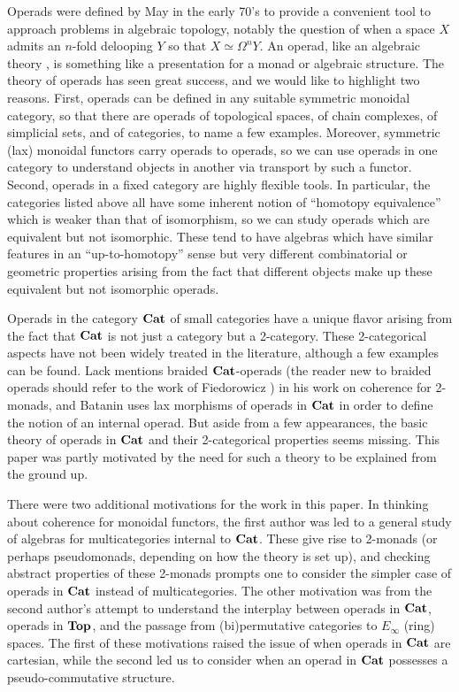 Operads were defined by May \cite{maygeom} in the early 70's to provide a convenient tool to approach problems in algebraic topology, notably the question of when a space $X$ admits an $n$-fold delooping $Y$ so that $X \simeq \Omega^{n}Y$.  An operad, like an algebraic theory \cite{lawvere-thesis}, is something like a presentation for a monad or algebraic structure.  The theory of operads has seen great success, and we would like to highlight two reasons.  First, operads can be defined in any suitable symmetric monoidal category, so that there are operads of topological spaces, of chain complexes, of simplicial sets, and of categories, to name a few examples.  Moreover, symmetric (lax) monoidal functors carry operads to operads, so we can use operads in one category to understand objects in another via transport by such a functor.  Second, operads in a fixed category are highly flexible tools.  In particular, the categories listed above all have some inherent notion of ``homotopy equivalence'' which is weaker than that of isomorphism, so we can study operads which are equivalent but not isomorphic.  These tend to have algebras which have similar features in an ``up-to-homotopy'' sense but very different combinatorial or geometric properties arising from the fact that different objects make up these equivalent but not isomorphic operads.

Operads in the category $\mathbf{Cat}$ of small categories have a unique flavor arising from the fact that $\mathbf{Cat}$ is not just a category but a 2-category.  These 2-categorical aspects have not been widely treated in the literature, although a few examples can be found.  Lack \cite{lack-cod} mentions braided $\mathbf{Cat}$-operads (the reader new to braided operads should refer to the work of Fiedorowicz \cite{fie-br}) in his work on coherence for 2-monads, and Batanin \cite{bat-eh} uses lax morphisms of operads in $\mathbf{Cat}$ in order to define the notion of an internal operad.  But aside from a few appearances, the basic theory of operads in $\mathbf{Cat}$ and their 2-categorical properties seems missing.  This paper was partly motivated by the need for such a theory to be explained from the ground up.

There were two additional motivations for the work in this paper.  In thinking about coherence for monoidal functors, the first author was led to a general study of algebras for multicategories internal to $\mathbf{Cat}$.  These give rise to 2-monads (or perhaps pseudomonads, depending on how the theory is set up), and checking abstract properties of these 2-monads prompts one to consider the simpler case of operads in $\mathbf{Cat}$ instead of multicategories.  The other motivation was from the second author's attempt to understand the interplay between operads in $\mathbf{Cat}$, operads in $\mathbf{Top}$, and the passage from (bi)permutative categories to $E_{\infty}$ (ring) spaces.  The first of these motivations raised the issue of when operads in $\mathbf{Cat}$ are cartesian, while the second led us to consider when an operad in $\mathbf{Cat}$ possesses a pseudo-commutative structure.

